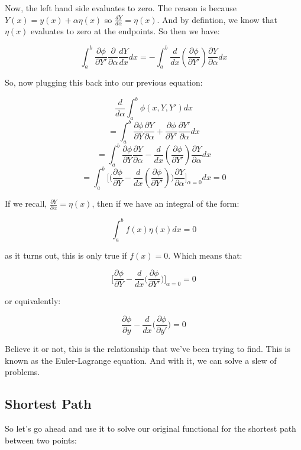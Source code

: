 \documentclass{article}
\begin{document}
Now, the left hand side evaluates to zero.  The reason is because $Y( x ) = y( x ) + \alpha \eta( x )$ so $\frac{ dY }{ d\alpha } = \eta( x )$.  And by defintion, we know that $\eta( x )$ evaluates to zero at the endpoints.  So then we have:

$$\int_a^b \frac{ \partial \phi }{ \partial Y' } \frac{ \partial }{ \partial \alpha } \frac{ dY }{ dx } dx = - \int_a^b \frac{ d }{ dx } ( \frac{ \partial \phi }{ \partial Y' } ) \frac{ \partial Y }{ \partial \alpha } dx$$

So, now plugging this back into our previous equation:

$$\frac{ d }{ d\alpha } \int_a^b \phi( x, Y, Y' ) dx$$
$$ = \int_a^b \frac{ \partial \phi }{ \partial Y } \frac{ \partial Y }{ \partial \alpha } + \frac{ \partial \phi }{ \partial Y' } \frac{ \partial Y' }{ \partial \alpha } dx$$
$$ = \int_a^b \frac{ \partial \phi }{ \partial Y } \frac{ \partial Y }{ \partial \alpha } - \frac{ d }{ dx } ( \frac{ \partial \phi }{ \partial Y' } ) \frac{ \partial Y }{ \partial \alpha } dx$$
$$ = \int_a^b \Big[ \Big( \frac{ \partial \phi }{ \partial Y } - \frac{ d }{ dx } ( \frac{ \partial \phi }{ \partial Y' } ) \Big) \frac{ \partial Y }{ \partial \alpha } \Big]_{\alpha = 0} dx = 0$$

If we recall, $\frac{ \partial Y }{ \partial \alpha } = \eta( x )$, then if we have an integral of the form:

$$\int_a^b f( x ) \eta( x ) dx = 0$$

as it turns out, this is only true if $f( x ) = 0$.  Which means that:

$$\Big[ \frac{ \partial \phi }{ \partial Y } - \frac{ d }{ dx } \Big( \frac{ \partial \phi }{ \partial Y' } \Big) \Big]_{\alpha = 0 }= 0$$

or equivalently:

\begin{equation}
\frac{ \partial \phi }{ \partial y } - \frac{ d }{ dx } \Big( \frac{ \partial \phi }{ \partial y' } \Big)= 0
\end{equation}

Believe it or not, this is the relationship that we've been trying to find.  This is known as the Euler-Lagrange equation.  And with it, we can solve a slew of problems.

%
%
%
\subsection{Shortest Path}

So let's go ahead and use it to solve our original functional for the shortest path between two points:
\end{document}
